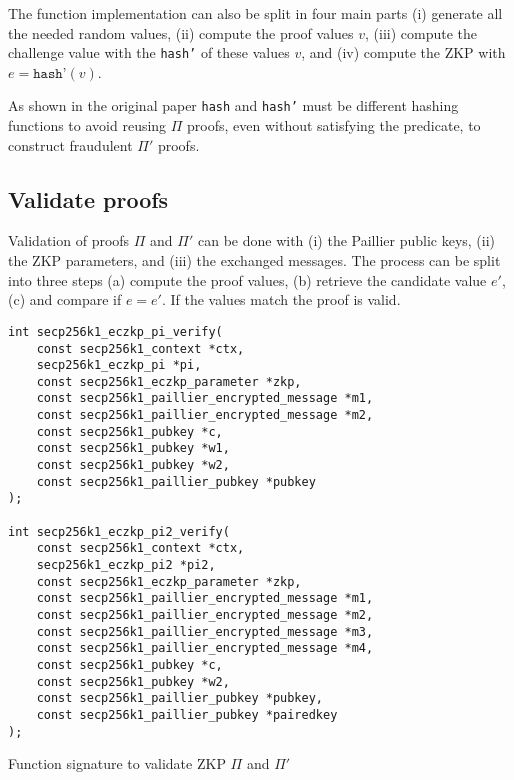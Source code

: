 The function implementation can also be split in four main parts (i) generate
all the needed random values, (ii) compute the proof values $v$, (iii) compute
the challenge value with the \texttt{hash'} of these values $v$, and (iv)
compute the ZKP with $e = \texttt{hash'}(v)$.

As shown in the original paper \texttt{hash} and \texttt{hash'} must be different
hashing functions to avoid reusing $\Pi$ proofs, even without satisfying the
predicate, to construct fraudulent $\Pi'$ proofs.

\subsection{Validate proofs}

Validation of proofs $\Pi$ and $\Pi'$ can be done with (i) the Paillier public
keys, (ii) the ZKP parameters, and (iii) the exchanged messages. The process can
be split into three steps (a) compute the proof values, (b) retrieve the candidate
value $e'$, (c) and compare if $e = e'$. If the values match the proof is valid.

\begin{longlisting}
  \begin{verbatim}
int secp256k1_eczkp_pi_verify(
    const secp256k1_context *ctx,
    secp256k1_eczkp_pi *pi,
    const secp256k1_eczkp_parameter *zkp,
    const secp256k1_paillier_encrypted_message *m1,
    const secp256k1_paillier_encrypted_message *m2,
    const secp256k1_pubkey *c,
    const secp256k1_pubkey *w1,
    const secp256k1_pubkey *w2,
    const secp256k1_paillier_pubkey *pubkey
);

int secp256k1_eczkp_pi2_verify(
    const secp256k1_context *ctx,
    secp256k1_eczkp_pi2 *pi2,
    const secp256k1_eczkp_parameter *zkp,
    const secp256k1_paillier_encrypted_message *m1,
    const secp256k1_paillier_encrypted_message *m2,
    const secp256k1_paillier_encrypted_message *m3,
    const secp256k1_paillier_encrypted_message *m4,
    const secp256k1_pubkey *c,
    const secp256k1_pubkey *w2,
    const secp256k1_paillier_pubkey *pubkey,
    const secp256k1_paillier_pubkey *pairedkey
);
  \end{verbatim}
	\caption{Function signature to validate ZKP $\Pi$ and $\Pi'$}
	\label{lst:funcSigValidatePiPi2}
\end{longlisting}


